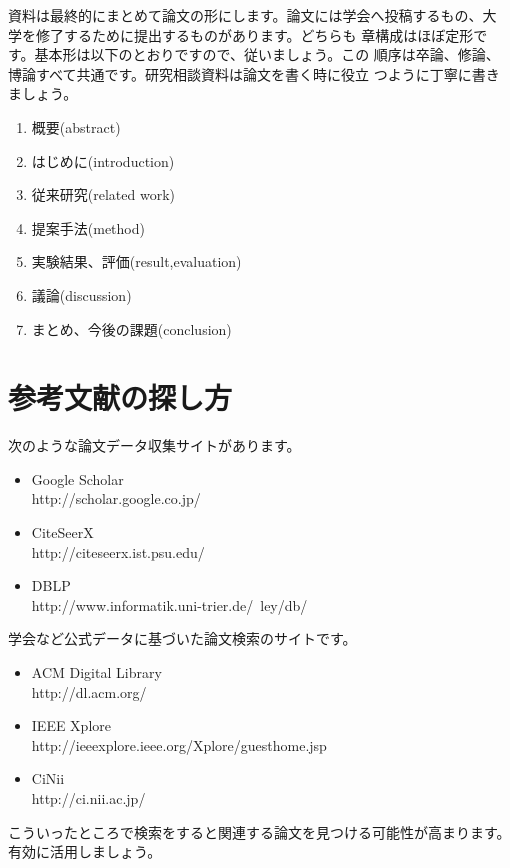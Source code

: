 \documentclass[a4]{jarticle}
\begin{document}
    資料は最終的にまとめて論文の形にします。論文には学会へ投稿するもの、大
    学を修了するために提出するものがあります。どちらも
    章構成はほぼ定形です。基本形は以下のとおりですので、従いましょう。この
    順序は卒論、修論、博論すべて共通です。研究相談資料は論文を書く時に役立
    つように丁寧に書きましょう。

    \begin{enumerate}
        \item 概要(abstract)
        \item はじめに(introduction)
        \item 従来研究(related work)
        \item 提案手法(method)
        \item 実験結果、評価(result,evaluation)
        \item 議論(discussion)
        \item まとめ、今後の課題(conclusion)
    \end{enumerate}

    \section{参考文献の探し方}

    次のような論文データ収集サイトがあります。
    \begin{itemize}
        \item Google Scholar\\http://scholar.google.co.jp/
        \item CiteSeerX\\http://citeseerx.ist.psu.edu/
        \item DBLP\\http://www.informatik.uni-trier.de/~ley/db/
    \end{itemize}

    学会など公式データに基づいた論文検索のサイトです。
    \begin{itemize}
        \item ACM Digital Library\\http://dl.acm.org/
        \item IEEE Xplore\\http://ieeexplore.ieee.org/Xplore/guesthome.jsp
        \item CiNii\\http://ci.nii.ac.jp/
    \end{itemize}

    こういったところで検索をすると関連する論文を見つける可能性が高まります。
    有効に活用しましょう。

    
    \small
    
\end{document}
